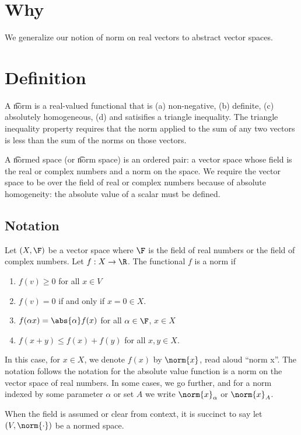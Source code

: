 
\section*{Why}

We generalize our notion of norm on real vectors to abstract vector spaces.

\section*{Definition}

A \t{norm} is a real-valued functional that is
(a) non-negative,
(b) definite,
(c) absolutely homogeneous,
(d) and satisifies a triangle inequality.
The triangle inequality property requires that the norm applied to the sum of any two vectors is less than the sum of the norms on those vectors.

A \t{normed space} (or \t{norm space}) is an ordered pair: a vector space whose field is the real or complex numbers and a norm on the space.
We require the vector space to be over the field of real or complex numbers because of absolute homogeneity: the absolute value of a scalar must be defined.

\subsection*{Notation}

Let $(X, \F )$ be a vector space where $\F $ is the field of real numbers or the field of complex numbers.
Let $f: X \to \R $.
The functional $f$ is a norm if
    \begin{enumerate}
      \item $f(v) \geq 0$ for all $x \in V$
      \item $f(v) = 0$ if and only if $x = 0 \in X$.
      \item $f(\alpha  x) = \abs{\alpha }f(x)$ for all $\alpha \in \F $, $x \in X$
      \item $f(x + y) \leq f(x) + f(y)$ for all $x, y \in X$.
    \end{enumerate}

In this case, for $x \in X$, we denote $f(x)$ by $\norm{x}$, read aloud ``norm x''.
The notation follows the notation for the absolute value function is a norm on the vector space of real numbers.
In some cases, we go further, and for a norm indexed by some parameter $\alpha $ or set $A$ we write $\norm{x}_\alpha $ or $\norm{x}_A$.

When the field is assumed or clear from context, it is succinct to say let $(V, \norm{\cdot })$ be a normed space.

